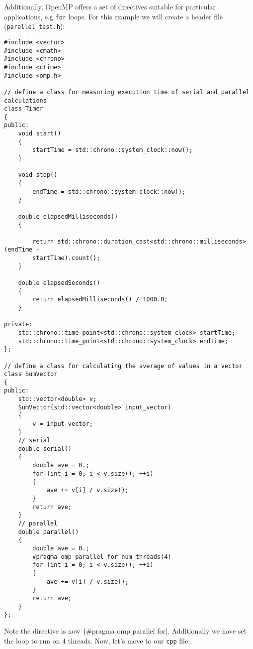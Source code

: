 \documentclass{article}
\begin{document}
Additionally, OpenMP offers a set of directives suitable for particular applications, e.g \verb|for| loops. For this example we will create a header file (\verb|parallel_test.h|):

\begin{verbatim}
#include <vector>
#include <cmath>
#include <chrono>
#include <ctime>
#include <omp.h>

// define a class for measuring execution time of serial and parallel calculations
class Timer
{
public:
    void start()
    {
        startTime = std::chrono::system_clock::now();
    }

    void stop()
    {
        endTime = std::chrono::system_clock::now();
    }

    double elapsedMilliseconds()
    {

        return std::chrono::duration_cast<std::chrono::milliseconds>(endTime -
        startTime).count();
    }

    double elapsedSeconds()
    {
        return elapsedMilliseconds() / 1000.0;
    }

private:
    std::chrono::time_point<std::chrono::system_clock> startTime;
    std::chrono::time_point<std::chrono::system_clock> endTime;
};

// define a class for calculating the average of values in a vector
class SumVector
{
public:
    std::vector<double> v;
    SumVector(std::vector<double> input_vector)
    {
        v = input_vector;
    }
    // serial
    double serial()
    {
        double ave = 0.;
        for (int i = 0; i < v.size(); ++i)
        {
            ave += v[i] / v.size();
        }
        return ave;
    }
    // parallel
    double parallel()
    {
        double ave = 0.;
        #pragma omp parallel for num_threads(4)
        for (int i = 0; i < v.size(); ++i)
        {
            ave += v[i] / v.size();
        }
        return ave;
    }
}; 
\end{verbatim}

Note the directive is now \texttt|#pragma omp parallel for|. Additionally we have set the loop to run on 4 threads.
Now, let's move to our \verb|cpp| file:
\end{document}
